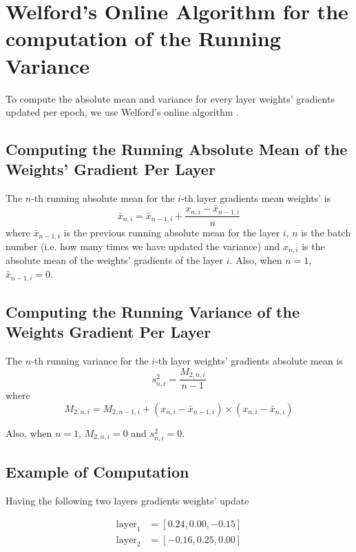 \documentclass[MSc,english,french]{ulthese}
\begin{document}
\chapter*{Welford's Online Algorithm for the computation of the Running Variance}
To compute the absolute mean and variance for every layer weights' gradients updated per epoch, we use Welford's online algorithm \citep{doi:10.1080/00401706.1962.10490022}. 

\section*{Computing the Running Absolute Mean of the Weights' Gradient Per Layer}
The $n$-th running absolute mean for the $i$-th layer gradients mean weights' is
\begin{equation*}
\bar{x}_{n, i} = \bar{x}_{n - 1 , i} + \frac{x_{n, i} - \bar{x}_{n - 1, i} }{n}
\end{equation*}	
where $\bar{x}_{n - 1, i}$ is the previous running absolute mean for the layer $i$, $n$ is the batch number (i.e. how many times we have updated the variance) and $x_{n, i}$ is the absolute mean of the weights' gradients of the layer $i$. Also, when $n = 1$, $\bar{x}_{n - 1, i} = 0$.

\section*{Computing the Running Variance of the Weights Gradient Per Layer}
The $n$-th running variance for the $i$-th layer weights' gradients absolute mean is
\begin{equation*}
s^2_{n, i} = \frac{M_{2, n, i}}{n - 1}
\end{equation*}	
where
\begin{equation*}
M_{2, n, i} = M_{2, n- 1, i} + (x_{n, i} - \bar{x}_{n-1, i}) \times (x_{n, i} - \bar{x}_{n, i})
\end{equation*}

Also, when $n = 1$, $M_{2, n, i} = 0$ and $s^2_{n, i} = 0$.

\newpage
\section*{Example of Computation}
Having the following two layers gradients weights' update

\begin{align*}
\text{layer}_1 &= [ 0.24, 0.00, -0.15] \\
\text{layer}_2 &= [-0.16, 0.25, 0.00]
\end{align*}
\end{document}
